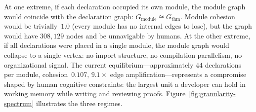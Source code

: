 At one extreme, if each declaration occupied its own module, the module graph would coincide with the declaration graph: $G_{\mathrm{module}} \cong G_{\mathrm{thm}}$. Module cohesion would be trivially~$1.0$ (every module has no internal edges to lose), but the graph would have $308{,}129$ nodes and be unnavigable by humans. At the other extreme, if all declarations were placed in a single module, the module graph would collapse to a single vertex: no import structure, no compilation parallelism, no organizational signal. The current equilibrium---approximately $44$ declarations per module, cohesion~$0.107$, $9.1\times$ edge amplification---represents a compromise shaped by human cognitive constraints: the largest unit a developer can hold in working memory while writing and reviewing proofs. Figure~\ref{fig:granularity-spectrum} illustrates the three regimes.

